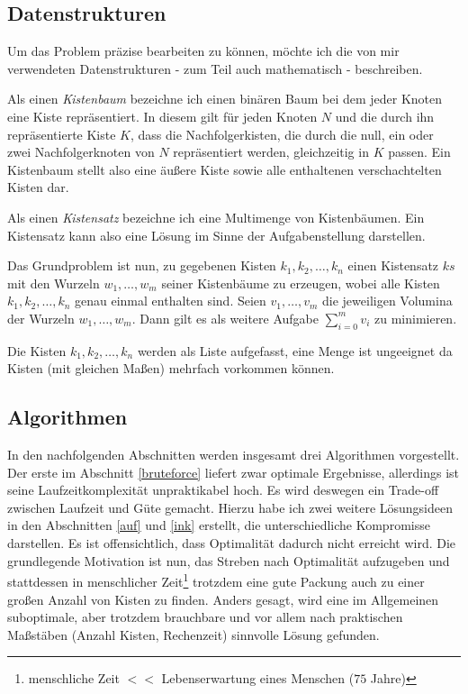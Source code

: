 \subsection{Datenstrukturen}
 Um das Problem präzise bearbeiten zu können, möchte ich die von mir verwendeten Datenstrukturen - zum Teil auch mathematisch - beschreiben.

 Als einen \emph{Kistenbaum} bezeichne ich einen binären Baum bei dem jeder Knoten eine Kiste repräsentiert.
 In diesem gilt für jeden Knoten $N$ und die durch ihn repräsentierte Kiste $K$, dass die Nachfolgerkisten,
 die durch die null, ein oder zwei Nachfolgerknoten von $N$ repräsentiert werden, gleichzeitig in $K$ passen.
 Ein Kistenbaum stellt also eine äußere Kiste sowie alle enthaltenen verschachtelten Kisten dar.

 Als einen \emph{Kistensatz} bezeichne ich eine Multimenge von Kistenbäumen.
 Ein Kistensatz kann also eine Lösung im Sinne der Aufgabenstellung darstellen.

 Das Grundproblem ist nun, zu gegebenen Kisten $k_1,k_2,\dots,k_n$
 einen Kistensatz $ks$ mit den Wurzeln $w_1,\dots,w_m$ seiner Kistenbäume zu erzeugen, wobei alle Kisten $k_1,k_2,\dots,k_n$ genau einmal enthalten sind.
 Seien $v_1,\dots,v_m$ die jeweiligen Volumina der Wurzeln $w_1,\dots,w_m$. Dann gilt es als weitere Aufgabe $\sum_{i=0}^{m}{v_i}$ zu minimieren.

 Die Kisten $k_1,k_2,\dots,k_n$ werden als Liste aufgefasst, eine Menge ist ungeeignet da Kisten (mit gleichen Maßen) mehrfach vorkommen können.
\subsection{Algorithmen}
 In den nachfolgenden Abschnitten werden insgesamt drei Algorithmen vorgestellt.
 Der erste im Abschnitt \ref{bruteforce} liefert zwar optimale Ergebnisse, allerdings ist seine Laufzeitkomplexität unpraktikabel hoch.
 Es wird deswegen ein Trade-off zwischen Laufzeit und Güte gemacht.
 Hierzu habe ich zwei weitere Lösungsideen in den Abschnitten \ref{auf} und \ref{ink} erstellt, die unterschiedliche Kompromisse darstellen.
 Es ist offensichtlich, dass Optimalität dadurch nicht erreicht wird.
 Die grundlegende Motivation ist nun,
 das Streben nach Optimalität aufzugeben und stattdessen in menschlicher Zeit\footnote{menschliche Zeit $<<$ Lebenserwartung eines Menschen ($75$ Jahre)}
  trotzdem eine gute Packung auch zu einer großen Anzahl von Kisten zu finden.
 Anders gesagt, wird eine im Allgemeinen suboptimale, aber trotzdem brauchbare und vor allem nach praktischen Maßstäben (Anzahl Kisten, Rechenzeit) sinnvolle Lösung gefunden.
